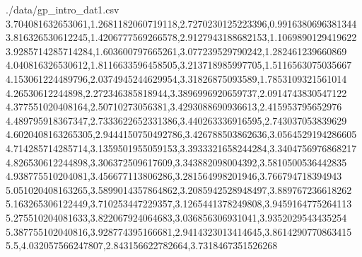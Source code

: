 \begin{filecontents*}{./data/gp_intro_dat1.csv}
    3.704081632653061,1.2681182060719118,2.7270230125223396,0.9916380696381344
    3.816326530612245,1.4206777569266578,2.9127943188682153,1.1069890129419622
    3.9285714285714284,1.603600797665261,3.077239529790242,1.282461239660869
    4.040816326530612,1.8116633596458505,3.213718985997705,1.5116563075035667
    4.153061224489796,2.0374945244629954,3.31826875093589,1.7853109321561014
    4.26530612244898,2.272346385818944,3.3896996920659737,2.0914743830547122
    4.377551020408164,2.50710273056381,3.4293088690936613,2.415953795652976
    4.489795918367347,2.7333622652331386,3.440263336916595,2.743037053839629
    4.6020408163265305,2.9444150750492786,3.426788503862636,3.0564529194286605
    4.714285714285714,3.1359501955059153,3.3933321658244284,3.3404756976868217
    4.826530612244898,3.306372509617609,3.343882098004392,3.5810500536442835
    4.938775510204081,3.456677113806286,3.281564998201946,3.766794718394943
    5.051020408163265,3.5899014357864862,3.2085942528948497,3.889767236618262
    5.163265306122449,3.710253447229357,3.1265441378249808,3.9459164775264113
    5.275510204081633,3.822067924064683,3.036856306931041,3.9352029543435254
    5.387755102040816,3.928774395166681,2.9414323013414645,3.8614290770863415
    5.5,4.032057566247807,2.843156622782664,3.7318467351526268
\end{filecontents*}

